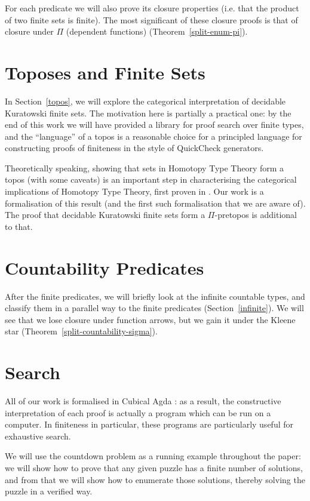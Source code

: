 For each predicate we will also prove its closure properties (i.e. that the
product of two finite sets is finite).
The most significant of these closure proofs is that of closure under \(\Pi\)
(dependent functions) (Theorem~\ref{split-enum-pi}).
\section{Toposes and Finite Sets}
In Section~\ref{topos}, we will explore the categorical interpretation of
decidable Kuratowski finite sets.
The motivation here is partially a practical one: by the end of this work we
will have provided a library for proof search over finite types, and the
``language'' of a topos is a reasonable choice for a principled language for
constructing proofs of finiteness in the style of QuickCheck
\cite{claessenQuickCheckLightweightTool2011} generators.

Theoretically speaking, showing that sets in Homotopy Type Theory form a topos
(with some caveats) is an important step in characterising the categorical
implications of Homotopy Type Theory, first proven in
\cite{rijkeSetsHomotopyType2015}.
Our work is a formalisation of this result (and the first such formalisation
that we are aware of).
The proof that decidable Kuratowski finite sets form a \(\Pi\)-pretopos is
additional to that.
\section{Countability Predicates}
After the finite predicates, we will briefly look at the infinite countable
types, and classify them in a parallel way to the finite predicates
(Section~\ref{infinite}).
We will see that we lose closure under function arrows, but we gain it under the
Kleene star (Theorem~\ref{split-countability-sigma}).
\section{Search}
All of our work is formalised in Cubical Agda
\cite{vezzosiCubicalAgdaDependently2019}: as a result, the constructive
interpretation of each proof is actually a program which can be run on a
computer.
In finiteness in particular, these programs are particularly useful for
exhaustive search.

We will use the countdown problem as a running example throughout the paper: we
will show how to prove that any given puzzle has a finite number of solutions,
and from that we will show how to enumerate those solutions, thereby solving the
puzzle in a verified way.

